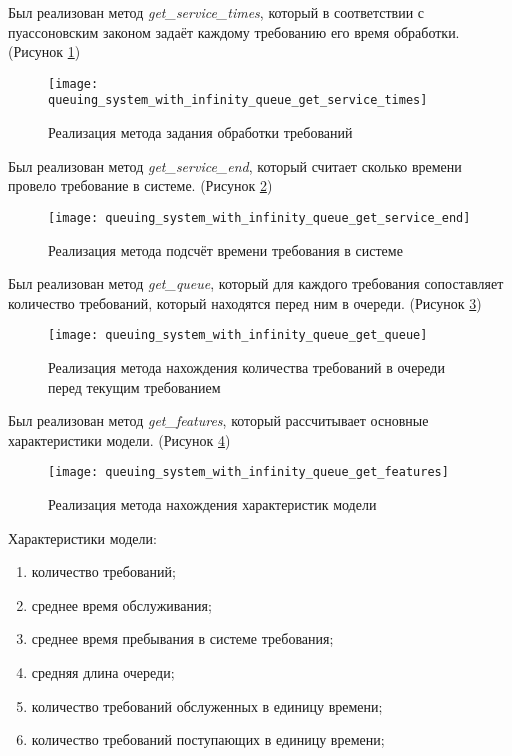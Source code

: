 Был реализован метод \textit{get\textup{\_}service\textup{\_}times}, который в соответствии с пуассоновским законом задаёт каждому требованию его время обработки. (Рисунок \ref{fig:queuing_system_with_infinity_queue_get_service_times})
\begin{figure}[h]
	\centering \texttt{[image: queuing\_system\_with\_infinity\_queue\_get\_service\_times]}
	\caption{Реализация метода задания обработки требований}
	\label{fig:queuing_system_with_infinity_queue_get_service_times}
\end{figure}

Был реализован метод \textit{get\textup{\_}service\textup{\_}end}, который считает сколько времени провело требование в системе. (Рисунок \ref{fig:queuing_system_with_infinity_queue_get_service_end})
\begin{figure}[h]
	\centering \texttt{[image: queuing\_system\_with\_infinity\_queue\_get\_service\_end]}
	\caption{Реализация метода подсчёт времени требования в системе}
	\label{fig:queuing_system_with_infinity_queue_get_service_end}
\end{figure}

\newpage
Был реализован метод \textit{get\textup{\_}queue}, который для каждого требования сопоставляет количество требований, который находятся перед ним в очереди. (Рисунок \ref{fig:queuing_system_with_infinity_queue_get_queue})
\begin{figure}[h]
	\centering \texttt{[image: queuing\_system\_with\_infinity\_queue\_get\_queue]}
	\caption{Реализация метода нахождения количества требований в очереди перед текущим требованием}
	\label{fig:queuing_system_with_infinity_queue_get_queue}
\end{figure}

Был реализован метод \textit{get\textup{\_}features}, который рассчитывает основные характеристики модели. (Рисунок \ref{fig:queuing_system_with_infinity_queue_get_features})
\begin{figure}[h]
	\centering \texttt{[image: queuing\_system\_with\_infinity\_queue\_get\_features]}
	\caption{Реализация метода нахождения характеристик модели}
	\label{fig:queuing_system_with_infinity_queue_get_features}
\end{figure}

Характеристики модели:
\begin{enumerate}[topsep=0pt,itemsep=-1ex,partopsep=1ex,parsep=1ex]
	\item количество требований;
	\item среднее время обслуживания;
	\item среднее время пребывания в системе требования;
	\item средняя длина очереди;
	\item количество требований обслуженных в единицу времени;
	\item количество требований поступающих в единицу времени;
\end{enumerate}

